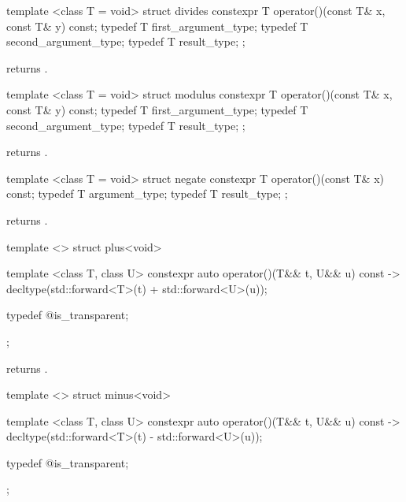 %
\begin{itemdecl}
template <class T = void> struct divides {
  constexpr T operator()(const T& x, const T& y) const;
  typedef T first_argument_type;
  typedef T second_argument_type;
  typedef T result_type;
};
\end{itemdecl}

\begin{itemdescr}
\pnum
{}
returns
.
\end{itemdescr}

%
\begin{itemdecl}
template <class T = void> struct modulus {
  constexpr T operator()(const T& x, const T& y) const;
  typedef T first_argument_type;
  typedef T second_argument_type;
  typedef T result_type;
};
\end{itemdecl}

\begin{itemdescr}
\pnum
{} returns .
\end{itemdescr}

%
\begin{itemdecl}
template <class T = void> struct negate {
  constexpr T operator()(const T& x) const;
  typedef T argument_type;
  typedef T result_type;
};
\end{itemdecl}

\begin{itemdescr}
\pnum
{} returns .
\end{itemdescr}

%
\begin{itemdecl}
template <> struct plus<void> {
  template <class T, class U> constexpr auto operator()(T&& t, U&& u) const
    -> decltype(std::forward<T>(t) + std::forward<U>(u));

  typedef @\unspec@ is_transparent;
};
\end{itemdecl}

\begin{itemdescr}
\pnum
{} returns .
\end{itemdescr}

%
\begin{itemdecl}
template <> struct minus<void> {
  template <class T, class U> constexpr auto operator()(T&& t, U&& u) const
    -> decltype(std::forward<T>(t) - std::forward<U>(u));

  typedef @\unspec@ is_transparent;
};
\end{itemdecl}

